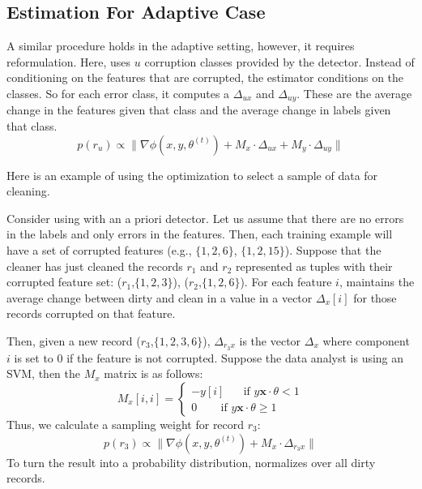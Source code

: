 \subsection{Estimation For Adaptive Case}
A similar procedure holds in the adaptive setting, however, it requires reformulation.
Here, \sys uses $u$ corruption classes provided by the detector.
Instead of conditioning on the features that are corrupted, the estimator conditions on the classes.
So for each error class, it computes a $\Delta_{ux}$ and $\Delta_{uy}$.
These are the average change in the features given that class and the average change in labels given that class.
\[
p(r_u)\propto\|\nabla\phi(x,y,\theta^{(t)}) + M_x \cdot \Delta_{ux} +  M_y \cdot \Delta_{uy}\|
\] 

Here is an example of using the optimization to select a sample of data for cleaning.
\begin{example}\label{estex}
Consider using \sys with an a priori detector.
Let us assume that there are no errors in the labels and only errors in the features.
Then, each training example will have a set of corrupted features (e.g., $\{1,2,6\}$, $\{1,2,15\}$).
Suppose that the cleaner has just cleaned the records $r_1$ and $r_2$ represented as tuples with their corrupted feature set: ($r_1$,$\{1,2,3\}$), ($r_2$,$\{1,2,6\}$).
For each feature $i$, \sys maintains the average change between dirty and clean in a value in a vector $\Delta_x[i]$ for those records corrupted on that feature. 

Then, given a new record ($r_3$,$\{1,2,3,6\}$), $\Delta_{r_3x}$ is the vector $\Delta_x$ where component $i$ is set to 0 if the feature is not corrupted.
Suppose the data analyst is using an SVM, then the $M_x$ matrix is as follows:
\[
M_x[i,i] = \begin{cases}      
-y[i] ~~~~~~\text{ if } y\boldsymbol{x}\cdot\theta < 1 \\
0\ ~~~~~~~\text{ if } y\boldsymbol{x}\cdot\theta \geq 1      
\end{cases} 
\]
Thus, we calculate a sampling weight for record $r_3$:
\[
p(r_3) \propto\|\nabla\phi(x,y,\theta^{(t)}) + M_x \cdot \Delta_{r_3x} \|
\] 
To turn the result into a probability distribution, \sys normalizes over all dirty records.
\end{example}
\fi

